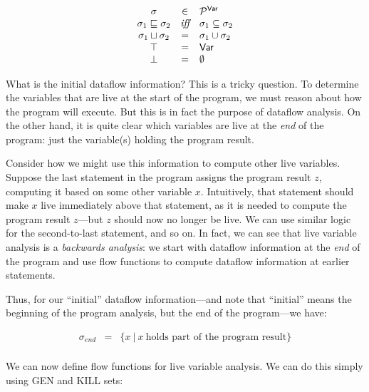 \documentclass[11pt]{article}
\newcommand{\join}{\sqcup}
\newcommand{\alap}{\sqsubseteq}
\begin{document}
\[
\begin{array}{ccl}

\sigma & \in & \mathcal{P}^{\textsf{Var}}\\
\sigma_1 \alap \sigma_2 & \textit{iff} & \sigma_1 \subseteq \sigma_2\\
\sigma_1 \join \sigma_2 & = & \sigma_1 \union \sigma_2\\
\top & = & \textsf{Var}\\
\bottom & = & \emptyset\\

\end{array}
\]


What is the initial dataflow information?  This is a tricky question.  To determine the variables that are live at the start of the program, we must reason about how the program will execute.  But this is in fact the purpose of dataflow analysis.  On the other hand, it is quite clear which variables are live at the \textit{end} of the program: just the variable(s) holding the program result.

Consider how we might use this information to compute other live variables.  Suppose the last statement in the program assigns the program result $z$, computing it based on some other variable $x$.  Intuitively, that statement should make $x$ live immediately above that statement, as it is needed to compute the program result $z$---but $z$ should now no longer be live.  We can use similar logic for the second-to-last statement, and so on.  In fact, we can see that live variable analysis is a \textit{backwards analysis}: we start with dataflow information at the \textit{end} of the program and use flow functions to compute dataflow information at earlier statements.

Thus, for our ``initial'' dataflow information---and note that ``initial'' means the beginning of the program analysis, but the end of the program---we have:

\[
\begin{array}{ccl}

\sigma_{end} & = & \{ x ~|~ x ~\mbox{holds part of the program result}\}\\

\end{array}
\]

We can now define flow functions for live variable analysis.  We can do this simply using GEN and KILL sets:
\end{document}
